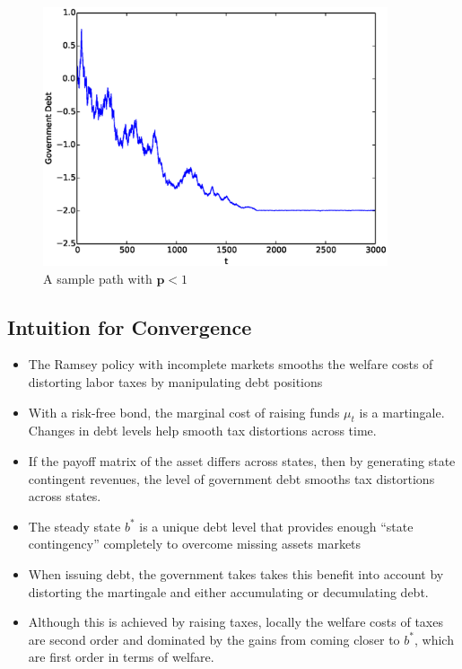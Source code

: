 \documentclass[12pt]{article}
\begin{document}
\begin{figure}
	\begin{center}
	\includegraphics[width=4in]{Images/port2.eps}
\caption{A sample path with   $\bm{p} <1$}
	\end{center}	
\end{figure}

\subsection{Intuition for Convergence}
	\small
	\begin{itemize}
	\item The Ramsey policy with incomplete markets smooths the welfare costs of distorting labor taxes by manipulating debt positions
	\item With a risk-free bond, the marginal cost of raising funds $\mu_t$ is  a martingale. Changes in debt levels help smooth tax distortions across time. 		
	\item  If the payoff matrix of the asset differs across states, then  by generating state contingent revenues, the level of government debt smooths tax distortions across states.
	\item The steady state $b^*$ is a unique debt level that provides enough ``state contingency'' completely to overcome  missing assets markets	
	\item  When issuing debt, the government takes takes this benefit into account by distorting the martingale and either accumulating or decumulating debt.	
	\item Although this is achieved by raising taxes, locally  the welfare costs of taxes are second order and dominated by the gains from coming closer to $b^*$, which are first order in terms of welfare.
	\end{itemize}
\end{document}
